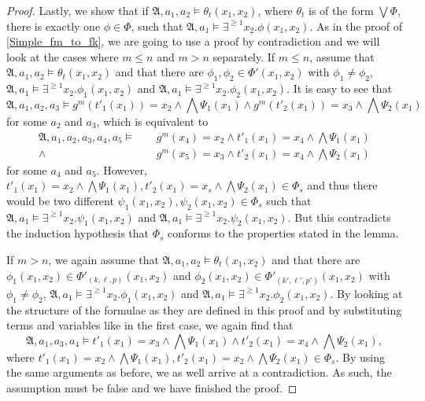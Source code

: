 \begin{proof}
	Lastly, we show that if $\mathfrak A,a_1,a_2\models \theta_t(x_1,x_2)$, where $\theta_t$ is of the form $\bigvee \Phi$, there is exactly one $\phi\in\Phi$, such that $\mathfrak A,a_1\models \exists^{\geq 1} x_2.\phi(x_1,x_2)$.
	As in the proof of \cref{Simple_fm_to_fk}, we are going to use a proof by contradiction and we will look at the cases where $m\leq n$ and $m> n$ separately.
	If $m\leq n$, assume that $\mathfrak A,a_1,a_2\models \theta_t(x_1,x_2)$ and that there are $\phi_1,\phi_2\in \Phi'(x_1,x_2)$ with $\phi_1\neq \phi_2$, $\mathfrak A,a_1\models \exists^{\geq 1}x_2.\phi_1(x_1,x_2)$ and $\mathfrak A,a_1\models \exists^{\geq 1}x_2.\phi_2(x_1,x_2)$.
	It is easy to see that 
	$$\mathfrak A,a_1,a_2,a_3\models g^m(t'_1(x_1))=x_2 \land \bigwedge \Psi_1(x_1) \land g^m(t'_2(x_1))=x_3 \land \bigwedge\Psi_2(x_1)$$
	for some $a_2$ and $a_3$, which is equivalent to
	\begin{align*}
		\mathfrak A,a_1,a_2,a_3,a_4,a_5\models
		\phantom{\land} &g^m(x_4)=x_2 \land t'_1(x_1)=x_4\land \bigwedge\Psi_1(x_1) \\ 
		\land &g^m(x_5)=x_3 \land t'_2(x_1)=x_4 \land \bigwedge\Psi_2(x_1)
	\end{align*}
	for some $a_4$ and $a_5$.
	However, $t'_1(x_1)=x_2\land \bigwedge\Psi_1(x_1), t'_2(x_1)=x_s \land \bigwedge\Psi_2(x_1) \in \Phi_s$ and thus there would be
	two different $\psi_1(x_1,x_2),\psi_2(x_1,x_2)\in \Phi_s$ such that $\mathfrak A,a_1\models \exists^{\geq 1} x_2.\psi_1(x_1,x_2)$ and $\mathfrak A,a_1\models \exists^{\geq 1} x_2.\psi_2(x_1,x_2)$.
	But this contradicts the induction hypothesis that $\Phi_s$ conforms to the properties stated in the lemma.
	
	If $m>n$, we again assume that $\mathfrak A,a_1,a_2\models \theta_t(x_1,x_2)$ and that there are $\phi_1(x_1,x_2)\in\Phi'_{(k,\ell,p)}(x_1,x_2)$ and $\phi_2(x_1,x_2)\in\Phi'_{(k',\ell',p')}(x_1,x_2)$ with $\phi_1\neq \phi_2$, $\mathfrak A,a_1\models \exists^{\geq 1}x_2.\phi_1(x_1,x_2)$ and $\mathfrak A,a_1\models \exists^{\geq 1}x_2.\phi_2(x_1,x_2)$.
	By looking at the structure of the formulae as they are defined in this proof and by substituting terms and variables like in the first case, we again find that 
	$$\mathfrak A,a_1,a_3,a_4\models t'_1(x_1)=x_3\land \bigwedge\Psi_1(x_1) \land t'_2(x_1)=x_4 \land \bigwedge\Psi_2(x_1),$$
	where $t'_1(x_1)=x_2\land\bigwedge \Psi_1(x_1), t'_2(x_1)=x_2\land\bigwedge \Psi_2(x_1)\in \Phi_s$.
	By using the same arguments as before, we as well arrive at a contradiction.
	As such, the assumption must be false and we have finished the proof.
\end{proof}

